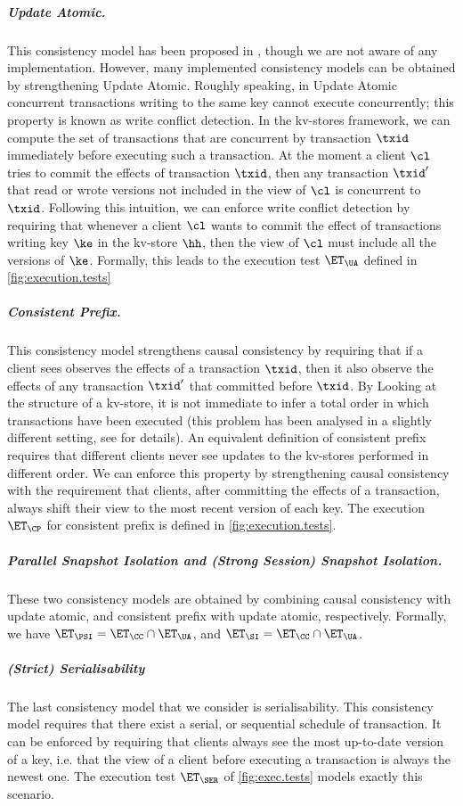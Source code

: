 \subparagraph{Update Atomic.} 
This consistency model has been proposed in \cite{framework-concur}, though we 
are not aware of any implementation. However, many implemented consistency models 
can be obtained by strengthening Update Atomic. Roughly speaking, in Update Atomic 
concurrent transactions writing to the same key cannot execute concurrently; this property 
is known as write conflict detection. In the kv-stores 
framework, we can compute the set of transactions that are concurrent by transaction $\txid$ 
immediately before executing such a transaction. At the moment a client $\cl$ tries to 
commit the effects of transaction $\txid$, then any transaction $\txid'$ that read or wrote versions not included 
in the view of $\cl$ is concurrent to $\txid$. Following this intuition, we can enforce write 
conflict detection by requiring that whenever a client $\cl$ wants to commit the effect of 
transactions writing key $\ke$ in the kv-store $\hh$, then the view of $\cl$ must include all the versions of $\ke$. 
Formally, this leads to the execution test $\ET_{\UA}$ defined in \cref{fig:execution.tests}

\subparagraph{Consistent Prefix.}
This consistency model strengthens causal consistency by requiring that if a client 
sees observes the effects of a transaction $\txid$, then it also observe the effects 
of any transaction $\txid'$ that committed before $\txid$. By Looking at the structure 
of a kv-store, it is not immediate to infer a total order in which transactions have been 
executed (this problem has been analysed in a slightly different setting, see \cite{SIanalysis,laws} 
for details). An equivalent definition of consistent prefix requires that different clients 
never see updates to the kv-stores performed in different order. We can enforce this property 
by strengthening causal consistency with the requirement that clients, 
after committing the effects of a transaction, always shift their view to 
the most recent version of each key.  The execution $\ET_{\CP}$ for consistent 
prefix is defined in \cref{fig:execution.tests}.

\subparagraph{Parallel Snapshot Isolation and (Strong Session) Snapshot Isolation.} 
These two consistency models are obtained by combining causal consistency with update atomic, 
and consistent prefix with update atomic, respectively. Formally, we have 
$\ET_{\PSI} = \ET_{\CC} \cap \ET_{\UA}$, and $\ET_{\SI} = \ET_{\CC} \cap \ET_{\UA}$.

\subparagraph{(Strict) Serialisability}
The last consistency model that we consider is serialisability. This consistency model 
requires that there exist a serial, or sequential schedule of transaction. It can be 
enforced by requiring that clients always see the most up-to-date version of a key, 
i.e. that the view of a client before executing a transaction is always the newest one. 
The execution test $\ET_{\SER}$ of \cref{fig:exec.tests} models exactly this scenario.